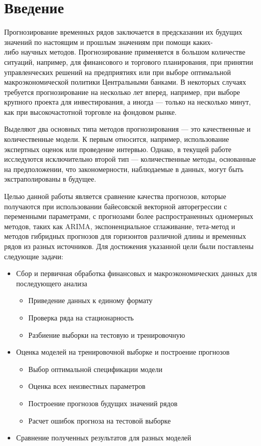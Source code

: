 \section*{Введение}
\label{sec:intro}

Прогнозирование временных рядов заключается в предсказании их будущих значений по настоящим и прошлым значениям при помощи каких-\\либо научных методов. Прогнозирование применяется в большом количестве ситуаций, например, для финансового и торгового планирования, при принятии управленческих решений на предприятиях или при выборе оптимальной макроэкономической политики Центральными банками. В некоторых случаях требуется прогнозирование на несколько лет вперед, например, при выборе крупного проекта для инвестирования, а иногда --- только на несколько минут, как при высокочастотной торговле на фондовом рынке. 

Выделяют два основных типа методов прогнозирования --- это качественные и количественные модели. К первым относится, например, использование экспертных оценок или проведение интервью. Однако, в текущей работе исследуются исключительно второй тип --- количественные методы, основанные на предположении, что закономерности, наблюдаемые в данных, могут быть экстраполированы в будущее.

Целью данной работы является сравнение качества прогнозов, которые получаются при использовании байесовской векторной авторегрессии с переменными параметрами, с прогнозами более распространенных одномерных методов, таких как ARIMA, экспоненциальное сглаживание, тета-метод и методов гибридных прогнозов для горизонтов различной длины и временных рядов из разных источников.  Для достижения указанной цели были поставлены следующие задачи:
\begin{itemize}
\item Сбор и первичная обработка финансовых и макроэкономических данных для последующего анализа
  \begin{itemize}
  \item Приведение данных к единому формату
  \item Проверка ряда на стационарность
  \item Разбиение выборки на тестовую и тренировочную
\end{itemize}
\item Оценка моделей на тренировочной выборке и построение прогнозов
  \begin{itemize}
  \item Выбор оптимальной спецификации модели
  \item Оценка всех неизвестных параметров 
  \item Построение прогнозов будущих значений рядов
  \item Расчет ошибок прогноза на тестовой выборке
\end{itemize}
\item Сравнение полученных результатов для разных моделей
\end{itemize}

